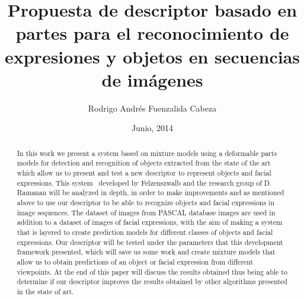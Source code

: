 \documentclass[final]{udpthesis}
\theoremstyle{definition}
\begin{document}
\frontmatter
\title{Propuesta de descriptor basado en partes para el reconocimiento de expresiones y objetos en secuencias de imágenes}
\author{Rodrigo Andrés Fuenzalida Cabeza}
\date{Junio, 2014}%

\makecover


\tableofcontents                        %
\listoffigures                          %

\begin{abstract}
In this work we present a system based on mixture models using a deformable parts models for detection and recognition of objects extracted from the state of the art which allow us to present and test a new descriptor to represent objects and facial expressions. This system~\cite{Felzenszwalb2008,Felzenszwalb2010,Felzenszwalb2013} developed by Felzenszwalb and the research group of D. Ramanan will be analyzed in depth, in order to make improvements and as mentioned above to use our descriptor to be able to recognize objects and facial expressions in image sequences. The dataset of images from PASCAL database images are used in addition to a dataset of images of facial expressions, with the aim of making a system that is layered to create prediction models for different classes of objects and facial expressions. Our descriptor will be tested under the parameters that this development framework presented, which will save us some work and create mixture models that allow us to obtain predictions of an object or facial expression from different viewpoints. At the end of this paper will discuss the results obtained thus being able to determine if our descriptor improves the results obtained by other algorithms presented in the state of art.
\end{abstract}
\end{document}
